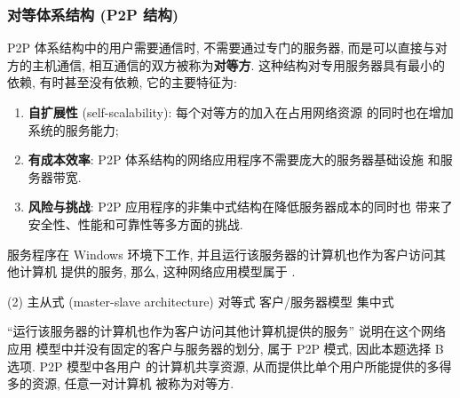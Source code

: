 \documentclass[10pt,UTF8]{book} %
\begin{document}
\subsubsection{对等体系结构 (P2P 结构)}

P2P 体系结构中的用户需要通信时, 不需要通过专门的服务器,
而是可以直接与对方的主机通信, 相互通信的双方被称为\textbf{对等方}. 
这种结构对专用服务器具有最小的依赖, 有时甚至没有依赖, 它的主要特征为:
\begin{enumerate}[itemsep=0pt, label={$\left.\mathrm{\alph*}\right)$}]
    \item \textbf{自扩展性} (self-scalability): 每个对等方的加入在占用网络资源
    的同时也在增加系统的服务能力;
    \item \textbf{有成本效率}: P2P 体系结构的网络应用程序不需要庞大的服务器基础设施
    和服务器带宽.
    \item \textbf{风险与挑战}: P2P 应用程序的非集中式结构在降低服务器成本的同时也
    带来了安全性、性能和可靠性等多方面的挑战. 
\end{enumerate}

\begin{example}
    服务程序在 Windows 环境下工作, 并且运行该服务器的计算机也作为客户访问其他计算机
    提供的服务, 那么, 这种网络应用模型属于 \underline{\qquad \qquad \qquad}.
    \begin{tasks}[label={\Alph*.}](2)
        \task 主从式 (master-slave architecture)
        \task 对等式
        \task 客户/服务器模型
        \task 集中式
    \end{tasks}
    \begin{cmt}
        “运行该服务器的计算机也作为客户访问其他计算机提供的服务” 说明在这个网络应用
        模型中并没有固定的客户与服务器的划分, 属于 P2P 模式, 因此本题选择 B 选项.
        P2P 模型中各用户
        的计算机共享资源, 从而提供比单个用户所能提供的多得多的资源, 任意一对计算机
        被称为对等方.
    \end{cmt}
\end{example}
\end{document}
